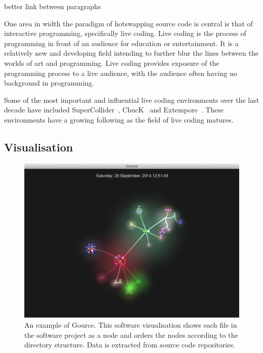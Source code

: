 {\color{red} better link between paragraphs}

One area in width the paradigm of hotswapping source code is central is that of interactive programming, specifically live coding. Live coding is the process of programming in front of an audience for education or entertainment. It is a relatively new and developing field intending to further blur the lines between the worlds of art and programming. Live coding provides exposure of the programming process to a live audience, with the audience often having no background in programming.

Some of the most important and influential live coding environments over the last decade have included SuperCollider~\cite{McCartney}, ChucK~\cite{Wang2008} and Extempore~\cite{Sorensen}. These environments have a growing following as the field of live coding matures.


\subsection{Visualisation}

\begin{figure}
\centering
\includegraphics[width=1.0\textwidth]{../images/gource.png}
\caption{An example of Gource. This software visualisation shows each file in the software project as a node and orders the nodes according to the directory structure. Data is extracted from source code repositories.}
\label{fig:gource}
\end{figure}

